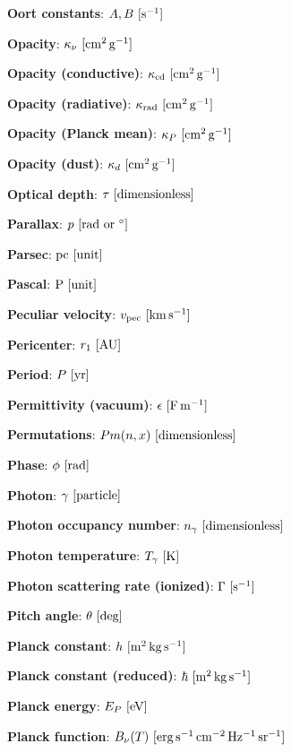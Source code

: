 \documentclass[a4paper,10pt]{article}
\begin{document}
{\noindent}\textbf{Oort constants}: $A,B ~ [{\rm s^{-1}}]$

{\noindent}\textbf{Opacity}: $\kappa_\nu ~ [{\rm cm^2\,g^{-1}}]$

{\noindent}\textbf{Opacity (conductive)}: $\kappa_{\rm cd} ~ [{\rm cm^2\,g^{-1}}]$

{\noindent}\textbf{Opacity (radiative)}: $\kappa_{\rm rad} ~ [{\rm cm^2\,g^{-1}}]$

{\noindent}\textbf{Opacity (Planck mean)}: $\kappa_P ~ [{\rm cm^2\,g^{-1}}]$

{\noindent}\textbf{Opacity (dust)}: $\kappa_d ~ [{\rm cm^2\,g^{-1}}]$

{\noindent}\textbf{Optical depth}: $\tau ~ [{\rm dimensionless}]$

{\noindent}\textbf{Parallax}: $p ~ [{\rm rad~or~^\circ}]$

{\noindent}\textbf{Parsec}: ${\rm pc} ~ [{\rm unit}]$

{\noindent}\textbf{Pascal}: ${\rm P} ~ [{\rm unit}]$

{\noindent}\textbf{Peculiar velocity}: $v_{\rm pec} ~ [{\rm km\,s^{-1}}]$

{\noindent}\textbf{Pericenter}: $r_1 ~ [{\rm AU}]$

{\noindent}\textbf{Period}: $P ~ [{\rm yr}]$

{\noindent}\textbf{Permittivity (vacuum)}: $\epsilon ~ [{\rm F\,m^{-1}}]$

{\noindent}\textbf{Permutations}: $Pm(n,x) ~ [{\rm dimensionless}]$

{\noindent}\textbf{Phase}: $\phi ~ [{\rm rad}]$

{\noindent}\textbf{Photon}: $\gamma ~ [{\rm particle}]$

{\noindent}\textbf{Photon occupancy number}: $n_\gamma ~ [{\rm dimensionless}]$

{\noindent}\textbf{Photon temperature}: $T_\gamma ~ [{\rm K}]$

{\noindent}\textbf{Photon scattering rate (ionized)}: $\Gamma ~ [{\rm s^{-1}}]$

{\noindent}\textbf{Pitch angle}: $\theta ~ [{\rm deg}]$

{\noindent}\textbf{Planck constant}: $h ~ [{\rm m^2\,kg\,s^{-1}}]$

{\noindent}\textbf{Planck constant (reduced)}: $\hbar ~ [{\rm m^2\,kg\,s^{-1}}]$

{\noindent}\textbf{Planck energy}: $E_P ~ [{\rm eV}]$

{\noindent}\textbf{Planck function}: $B_\nu(T) ~ [{\rm erg\,s^{-1}\,cm^{-2}\,Hz^{-1}\,sr^{-1}}]$
\end{document}
